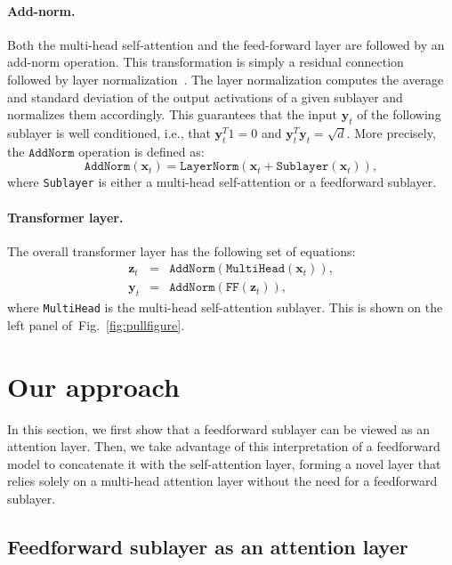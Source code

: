 \documentclass{article}
\begin{document}
\paragraph{Add-norm.}
Both the multi-head self-attention and the feed-forward layer are followed by an add-norm operation.
This transformation is simply a residual connection~\cite{he2016deep} followed by layer normalization~\cite{ba2016layer}.
The layer normalization computes the average and standard deviation of the output activations of a given sublayer and normalizes them accordingly.
This guarantees that the input $\mathbf{y}_t$ of the following sublayer is well conditioned, i.e., that $\mathbf{y}_t^T1=0$ and $\mathbf{y}_t^T\mathbf{y}_t=\sqrt{d}$.
More precisely, the $\texttt{AddNorm}$ operation is defined as:
\begin{equation}\label{eq:addnorm}
  \texttt{AddNorm}(\mathbf{x}_t) = \texttt{LayerNorm}(\mathbf{x}_t + \texttt{Sublayer}(\mathbf{x}_t)),
\end{equation}
where \texttt{Sublayer} is either a multi-head self-attention or a feedforward sublayer.

\paragraph{Transformer layer.}
The overall transformer layer has the following set of equations:
\begin{eqnarray}
  \mathbf{z}_t  & =& \texttt{AddNorm}(\texttt{MultiHead}(\mathbf{x}_t)),\\
  \mathbf{y}_t  & =& \texttt{AddNorm}(\texttt{FF}(\mathbf{z}_t)),
\end{eqnarray}
where \texttt{MultiHead} is the multi-head self-attention sublayer.
This is shown on the left panel of~Fig.~\ref{fig:pullfigure}.

\section{Our approach}
\label{sec:approach}

In this section, we first show that a feedforward sublayer can be viewed as an attention layer.
Then, we take advantage of this interpretation of a feedforward model to concatenate it with the self-attention layer, forming a novel layer that relies solely on a multi-head attention layer without the need for a feedforward sublayer.

\subsection{Feedforward sublayer as an attention layer}\label{sec:ffattn}
\end{document}
